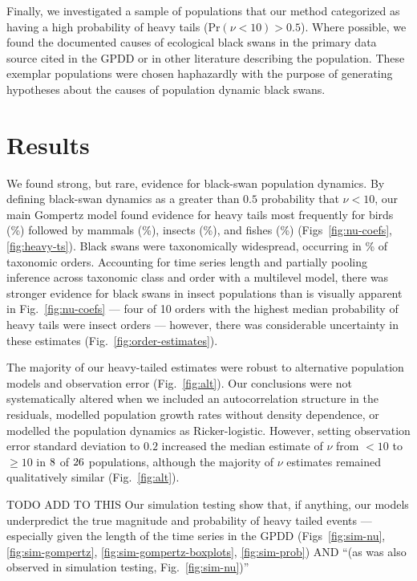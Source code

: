 Finally, we investigated a sample of populations that our method categorized as having a high probability of heavy tails (Pr$(\nu < 10) > 0.5$). Where possible, we found the documented causes of ecological black swans in the primary data source cited in the GPDD or in other literature describing the population. These exemplar populations were chosen haphazardly with the purpose of generating hypotheses about the causes of population dynamic black swans.

\section{Results}

We found strong, but rare, evidence for black-swan population dynamics. By defining black-swan dynamics as a greater than $0.5$ probability that $\nu < 10$, our main Gompertz model found evidence for heavy tails most frequently for birds (\birdPH\%) followed by mammals (\mammalsPH\%), insects (\insectsPH\%), and fishes (\fishPH\%) (Figs~\ref{fig:nu-coefs}, \ref{fig:heavy-ts}). Black swans were taxonomically widespread, occurring in \POrdersHeavy\% of taxonomic orders. Accounting for time series length and partially pooling inference across taxonomic class and order with a multilevel model, there was stronger evidence for black swans in insect populations than is visually apparent in Fig.~\ref{fig:nu-coefs} --- four of 10 orders with the highest median probability of heavy tails were insect orders --- however, there was considerable uncertainty in these estimates (Fig.~\ref{fig:order-estimates}).

The majority of our heavy-tailed estimates were robust to alternative population models and observation error (Fig.~\ref{fig:alt}). Our conclusions were not systematically altered when we included an autocorrelation structure in the residuals, modelled population growth rates without density dependence, or modelled the population dynamics as Ricker-logistic. However, setting observation error standard deviation to $0.2$ increased the median estimate of $\nu$ from $<10$ to $\ge 10$ in $8$ of $26$ populations, although the majority of $\nu$ estimates remained qualitatively similar (Fig.~\ref{fig:alt}).

TODO ADD TO THIS Our simulation testing show that, if anything, our models underpredict the true magnitude and probability of heavy tailed events --- especially given the length of the time series in the GPDD (Figs~\ref{fig:sim-nu}, \ref{fig:sim-gompertz}, \ref{fig:sim-gompertz-boxplots}, \ref{fig:sim-prob}) AND ``(as was also observed in simulation testing, Fig.~\ref{fig:sim-nu})''

